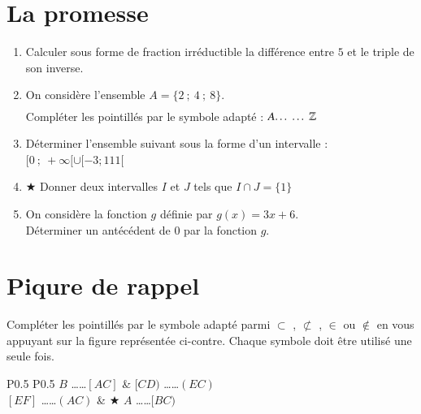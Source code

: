 \documentclass[oneside,12pt]{exam}          %
\begin{document}
\section{La promesse}
\begin{enumerate}
	\item Calculer sous forme de fraction irréductible la différence entre $5$ et le triple de son inverse.
	\item On considère l'ensemble $A = \{ 2 ~;~ 4 ~;~ 8 \}$. \\
	Compléter les pointillés par le symbole adapté : $A \ldots\ldots \ZZ$
	\item Déterminer l'ensemble suivant sous la forme d'un intervalle : $[0 ~;~ +\infty[ \cup [-3 ; 111[$
	\item $\bigstar$ Donner deux intervalles $I$ et $J$ tels que $I \cap J = \{1\}$
	\item On considère la fonction $g$ définie par $g(x) = 3x +6$.\\
	Déterminer un antécédent de $0$ par la fonction $g$.
\end{enumerate}



\section{Piqure de rappel}
\begin{minipage}{0.6\textwidth}
	Compléter les pointillés par le symbole adapté parmi $\subset$ , $\not\subset$ , $\in$ ou $\notin$ en vous appuyant sur la figure représentée ci-contre. Chaque symbole doit être utilisé une seule fois.
	
	\renewcommand{\arraystretch}{2}
	\begin{tabular}{P{0.5\textwidth} P{0.5\textwidth}}
		$B$ \ldots\ldots $[AC]$ & $[CD)$ \ldots\ldots $(EC)$ \\
		$[EF]$ \ldots\ldots $(AC)$ & $\bigstar$ $A$ \ldots\ldots $[BC)$
	\end{tabular}
\end{minipage} \hspace{10mm}
\begin{minipage}{0.4\textwidth}
\end{minipage}
\end{document}

